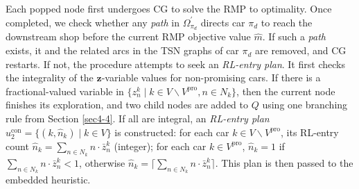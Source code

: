 \documentclass[12pt]{article}
\begin{document}
Each popped node first undergoes CG to solve the RMP to optimality. Once completed, we check whether any \textit{path} in $\Omega^{\prime}_{\pi_d}$ directs car $\pi_d$ to reach the downstream shop before the current RMP objective value $\widehat{m}$. If such a \textit{path} exists, it and the related arcs in the TSN graphs of car $\pi_d$ are removed, and CG restarts. If not, the procedure attempts to seek an \textit{RL-entry plan}. It first checks the integrality of the $\boldsymbol{z}$-variable values for non-promising cars. If there is a fractional-valued variable in $\{z^k_n\mid k\in V\backslash V^{\text{pro}}, n\in N_k\}$, then the current node finishes its exploration, and two child nodes are added to $Q$ using one branching rule from Section \ref{sec4-4}. If all are integral, an \textit{RL-entry plan} $u^{\text{con}}_2=\{(k,\widehat{n}_k)\mid k\in V\}$ is constructed: for each car $k\in V\backslash V^{\text{pro}}$, its RL-entry count $\widehat{n}_k=\sum_{n\in N_k}{n\cdot \bar{z}^k_n}$ (integer); for each car $k\in V^{\text{pro}}$, $\widehat{n}_k=1$ if $\sum_{n\in N_k}{n\cdot \bar{z}^k_n}<1$, otherwise $\widehat{n}_k=\big \lceil \sum_{n\in N_k}{n\cdot \bar{z}^k_n} \big \rceil$. This plan is then passed to the embedded heuristic.






\end{document}

